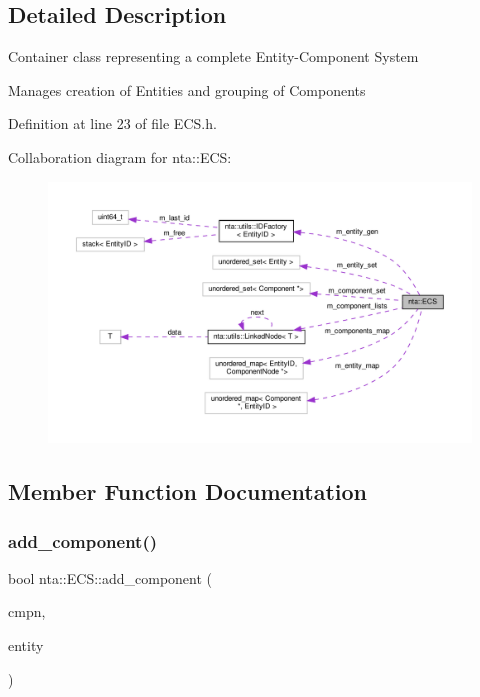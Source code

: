 \subsection{Detailed Description}
Container class representing a complete Entity-\/\+Component System

Manages creation of Entities and grouping of Components 

Definition at line 23 of file E\+C\+S.\+h.



Collaboration diagram for nta\+:\+:E\+CS\+:\nopagebreak
\begin{figure}[H]
\begin{center}
\leavevmode
\includegraphics[width=350pt]{d5/d5c/classnta_1_1ECS__coll__graph}
\end{center}
\end{figure}


\subsection{Member Function Documentation}
\mbox{\label{classnta_1_1ECS_a3388e8ae1ef45258356c742efcc00048}} 
\subsubsection{\texorpdfstring{add\+\_\+component()}{add\_component()}}
{\footnotesize\ttfamily bool nta\+::\+E\+C\+S\+::add\+\_\+component (\begin{DoxyParamCaption}\item[{\hyperlink{classnta_1_1Component}{Component} $\ast$}]{cmpn,  }\item[{Entity\+ID}]{entity }\end{DoxyParamCaption})}

